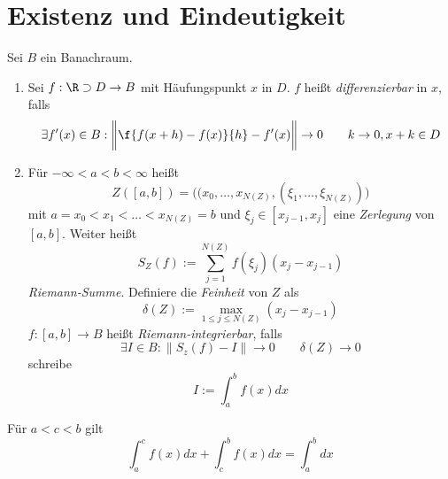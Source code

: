 %

\section{Existenz und Eindeutigkeit} %


\begin{df} \label{3.1}
	Sei $B$ ein Banachraum.
	\begin{enumerate}[1)]
		\item
			Sei $f: \R \supset D \to B$ mit Häufungspunkt $x$ in $D$.
			$f$ heißt \emph{differenzierbar} in $x$, falls
			\[
				\exists f'(x) \in B : \bigg\| \f{f(x+h)-f(x)}{h} - f'(x) \bigg\| \to 0
				\qquad k \to 0, x + k \in D
			\]
		\item
			Für $-\infty < a < b < \infty$ heißt
			\[
				Z([a,b]) = \Big( (x_0,\dotsc,x_{N(Z)}, (\xi_1, \dotsc, \xi_{N(Z)}) \Big)
			\]
			mit $a = x_0 < x_1 < \dotsc < x_{N(Z)} = b$ und $\xi_j \in [x_{j-1}, x_j]$ eine \emph{Zerlegung} von $[a,b]$.
			Weiter heißt
			\[
				S_Z(f) := \sum_{j=1}^{N(Z)} f(\xi_j)(x_j - x_{j-1})
			\]
			\emph{Riemann-Summe}.
			Definiere die \emph{Feinheit} von $Z$ als
			\[
				\delta(Z) := \max_{1\le j \le N(Z)} (x_j-x_{j-1})
			\]
			$f: [a,b] \to B$ heißt \emph{Riemann-integrierbar}, falls
			\[
				\exists I \in B : \|S_z(f) - I\| \to 0
				\qquad \delta(Z) \to 0
			\]
			schreibe
			\[
				I := \int_a^b f(x) dx
			\]
	\end{enumerate}
\end{df}

\begin{kor}[Folgerung]
	Für $a < c < b$ gilt
	\[
		\int_a^c f(x) dx + \int_c^b f(x) dx = \int_a^b dx
	\]
\end{kor}

